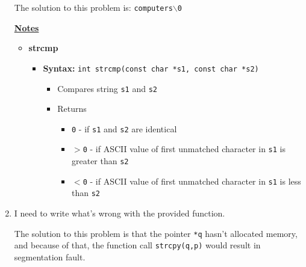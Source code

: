 \documentclass[12pt]{article}
\begin{document}
\begin{enumerate}[1.]
\begin{mdframed}
    \bigskip

    The solution to this problem is: \texttt{computers\color{red}$\backslash$0\color{black}}

    \end{mdframed}


    \bigskip

    \underline{\textbf{Notes}}

    \begin{itemize}
        \item \textbf{strcmp}

        \begin{itemize}
            \item \textbf{Syntax:} \texttt{int strcmp(const char *s1, const char *s2)}

            \begin{itemize}
                \item Compares string \texttt{s1} and \texttt{s2}
                \item Returns

                \begin{itemize}
                    \item \texttt{0} - if \texttt{s1} and \texttt{s2} are identical
                    \item \texttt{$>$0} - if ASCII value of first unmatched character in \texttt{s1} is greater than \texttt{s2}
                    \item \texttt{$<$0} - if ASCII value of first unmatched character in \texttt{s1} is less than \texttt{s2}
                \end{itemize}
            \end{itemize}
        \end{itemize}
    \end{itemize}

    \item

    I need to write what's wrong with the provided function.

    \bigskip

    The solution to this problem is that the pointer \texttt{*q} hasn't
    allocated memory, and because of that, the function call \texttt{strcpy(q,p)} would result in segmentation fault.

\end{enumerate}
\end{document}
